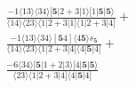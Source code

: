 \documentclass[varwidth, border=5pt]{standalone}
\begin{document}
\begin{my}
$\begin{gathered}
\scriptscriptstyle\frac{-1⟨13⟩⟨34⟩[𝟓|2+3|1⟩[1|𝟓|𝟓⟩}{⟨14⟩⟨23⟩⟨1|2+3|1]⟨1|2+3|4]} +\\
\scriptscriptstyle\frac{-1⟨13⟩⟨34⟩[𝟓4]⟨4𝟓⟩s_{𝟓}}{⟨14⟩⟨23⟩⟨1|2+3|4]⟨4|𝟓|4]} +\\
\scriptscriptstyle\frac{-6⟨34⟩[𝟓|1+2|3⟩[4|𝟓|𝟓⟩}{⟨23⟩⟨1|2+3|4]⟨4|𝟓|4]} \phantom{+}
\end{gathered}$
\end{my}
\end{document}
